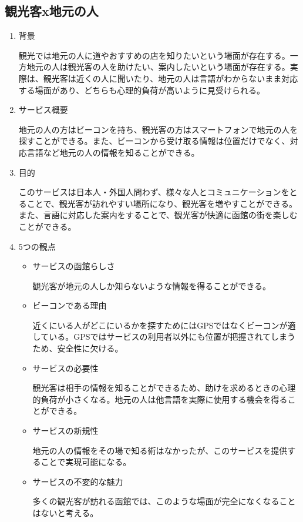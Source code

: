 \subsection{観光客x地元の人}
\begin{enumerate}
    \item 背景
    \par 観光では地元の人に道やおすすめの店を知りたいという場面が存在する。一方地元の人は観光客の人を助けたい、案内したいという場面が存在する。実際は、観光客は近くの人に聞いたり、地元の人は言語がわからないまま対応する場面があり、どちらも心理的負荷が高いように見受けられる。
    \item サービス概要
    \par 地元の人の方はビーコンを持ち、観光客の方はスマートフォンで地元の人を探すことができる。また、ビーコンから受け取る情報は位置だけでなく、対応言語など地元の人の情報を知ることができる。
    \item 目的
    \par このサービスは日本人・外国人問わず、様々な人とコミュニケーションをとることで、観光客が訪れやすい場所になり、観光客を増やすことができる。また、言語に対応した案内をすることで、観光客が快適に函館の街を楽しむことができる。
    \item 5つの観点
    \begin{itemize}
        \item サービスの函館らしさ
        \par 観光客が地元の人しか知らないような情報を得ることができる。
        \item ビーコンである理由
        \par 近くにいる人がどこにいるかを探すためにはGPSではなくビーコンが適している。GPSではサービスの利用者以外にも位置が把握されてしまうため、安全性に欠ける。
        \item サービスの必要性
        \par 観光客は相手の情報を知ることができるため、助けを求めるときの心理的負荷が小さくなる。地元の人は他言語を実際に使用する機会を得ることができる。
        \item サービスの新規性
        \par 地元の人の情報をその場で知る術はなかったが、このサービスを提供することで実現可能になる。
        \item サービスの不変的な魅力
        \par 多くの観光客が訪れる函館では、このような場面が完全になくなることはないと考える。
    \end{itemize}
\end{enumerate}

